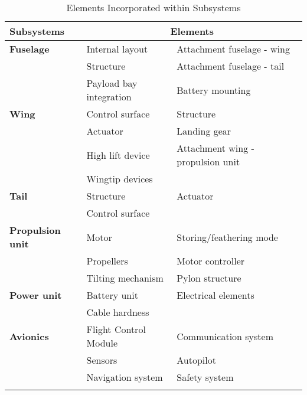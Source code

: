 \begin{table}[h]
\centering
\caption{Elements Incorporated within Subsystems}
\label{tab:elem_subs}
\begin{tabular}{lll}
\toprule
\textbf{Subsystems}     & \multicolumn{2}{c}{\textbf{Elements}}                               \\\midrule
\textbf{Fuselage}       & Internal layout            & Attachment fuselage - wing   \\
\textbf{}               & Structure                  & Attachment fuselage - tail   \\
\textbf{}               & Payload bay integration    & Battery mounting              \\\hdashline
\textbf{Wing}           & Control surface            & Structure                     \\
\textbf{}               & Actuator                   & Landing gear                  \\
\textbf{}               & High lift device           & Attachment wing - propulsion unit \\
                        & Wingtip devices            &                               \\\hdashline
\textbf{Tail}           & Structure                  & Actuator                      \\
\textbf{}               & Control surface            &                               \\\hdashline
\textbf{Propulsion unit}     & Motor                      & Storing/feathering mode       \\
\textbf{}               & Propellers                 & Motor controller              \\
\textbf{}               & Tilting mechanism          & Pylon structure               \\\hdashline
\textbf{Power unit}          & Battery unit               & Electrical elements           \\
\textbf{}               & Cable hardness             &                               \\\hdashline
\textbf{Avionics}       & Flight Control Module                        & Communication system          \\
\textbf{}               & Sensors                    & Autopilot                     \\
\textbf{}               & Navigation system          & Safety system                 \\\hdashline

\end{tabular}
\end{table}
